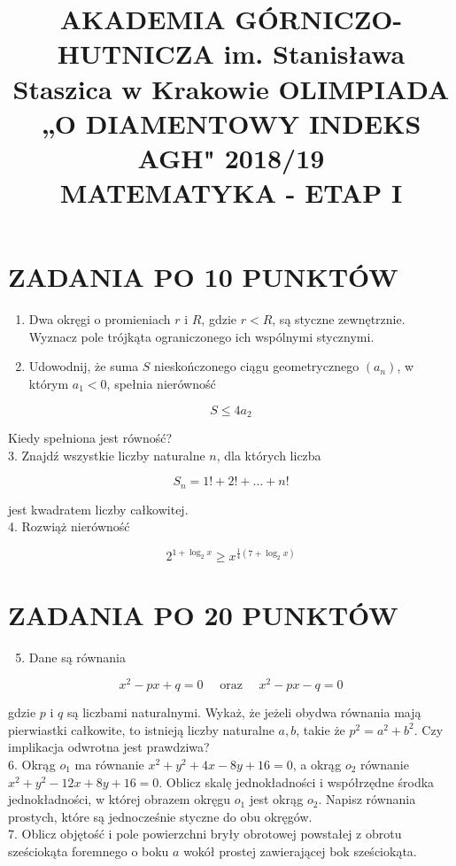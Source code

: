 \documentclass[10pt]{article}
\title{AKADEMIA GÓRNICZO-HUTNICZA im. Stanisława Staszica w Krakowie OLIMPIADA „O DIAMENTOWY INDEKS AGH" 2018/19 \\
 MATEMATYKA - ETAP I }
\author{}
\date{}
\begin{document}
\maketitle
\section*{ZADANIA PO 10 PUNKTÓW}
\begin{enumerate}
  \item Dwa okręgi o promieniach $r$ i $R$, gdzie $r<R$, są styczne zewnętrznie. Wyznacz pole trójkąta ograniczonego ich wspólnymi stycznymi.
  \item Udowodnij, że suma $S$ nieskończonego ciągu geometrycznego $\left(a_{n}\right)$, w którym $a_{1}<0$, spełnia nierówność
\end{enumerate}

$$
S \leqslant 4 a_{2}
$$

Kiedy spełniona jest równość?\\
3. Znajdź wszystkie liczby naturalne $n$, dla których liczba

$$
S_{n}=1!+2!+\ldots+n!
$$

jest kwadratem liczby całkowitej.\\
4. Rozwiąż nierówność

$$
2^{1+\log _{2} x} \geqslant x^{\frac{1}{4}\left(7+\log _{2} x\right)}
$$

\section*{ZADANIA PO 20 PUNKTÓW}
\begin{enumerate}
  \setcounter{enumi}{4}
  \item Dane są równania
\end{enumerate}

$$
x^{2}-p x+q=0 \quad \text { oraz } \quad x^{2}-p x-q=0
$$

gdzie $p$ i $q$ są liczbami naturalnymi. Wykaż, że jeżeli obydwa równania mają pierwiastki całkowite, to istnieją liczby naturalne $a, b$, takie że $p^{2}=a^{2}+b^{2}$. Czy implikacja odwrotna jest prawdziwa?\\
6. Okrąg $o_{1}$ ma równanie $x^{2}+y^{2}+4 x-8 y+16=0$, a okrąg $o_{2}$ równanie $x^{2}+y^{2}-12 x+8 y+16=0$. Oblicz skalę jednokładności i współrzędne środka jednokładności, w której obrazem okręgu $o_{1}$ jest okrąg $o_{2}$. Napisz równania prostych, które są jednocześnie styczne do obu okręgów.\\
7. Oblicz objętość i pole powierzchni bryły obrotowej powstałej z obrotu sześciokąta foremnego o boku $a$ wokół prostej zawierającej bok sześciokąta.
\end{document}
